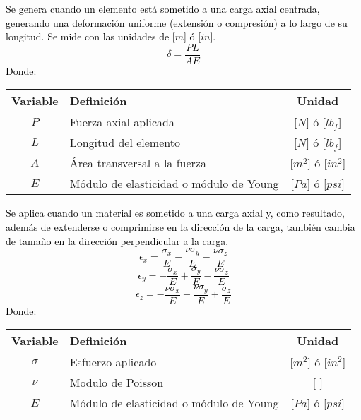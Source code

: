 \documentclass[letterpaper,11pt]{extarticle}
\newcommand{\mybox}[2]
{
    \begin{tcolorbox}[colback=color!5!white,colframe=color!75!black,boxsep=1pt,arc=0pt,outer arc=0pt,title={\textcolor{white}{#1}}]
        \textcolor{black}{#2}
    \end{tcolorbox}
}
\begin{document}
\begin{multicols}{2}
        \mybox{Deformación axial:}
        {
            Se genera cuando un elemento está sometido a una carga axial centrada, generando una deformación uniforme (extensión o compresión) a lo largo de su longitud. Se mide con las unidades de [$m$] ó [$in$].
            \begin{equation}
                \delta = \frac{PL}{AE}
            \end{equation}
            Donde:
            \begin{center}
                \begin{tabular}{ c | p{35mm} | c }
                    \hline Variable & Definición & Unidad \\ \hline 
                    $P$ & Fuerza axial aplicada & [$N$] ó [$lb_f$]\\
                    $L$ & Longitud del elemento & [$N$] ó [$lb_f$]\\
                    $A$ & Área transversal a la fuerza & [$m^2$] ó [$in^2$]\\
                    $E$ & Módulo de elasticidad o módulo de Young & [$Pa$] ó [$psi$]\\ \hline
                \end{tabular}
            \end{center}
        }

        \mybox{Modulo de Poisson:}
        {
            Se aplica cuando un material es sometido a una carga axial y, como resultado, además de extenderse o comprimirse en la dirección de la carga, también cambia de tamaño en la dirección perpendicular a la carga.
            \begin{equation}
                \epsilon_x = \frac{\sigma_x}{E} - \frac{\nu\sigma_y}{E} - \frac{\nu\sigma_z}{E}
            \end{equation}
            \begin{equation}
                \epsilon_y = -\frac{\sigma_x}{E} + \frac{\sigma_y}{E} - \frac{\nu\sigma_z}{E}
            \end{equation}
            \begin{equation}
                \epsilon_z = -\frac{\nu\sigma_x}{E} - \frac{\nu\sigma_y}{E} + \frac{\sigma_z}{E}
            \end{equation}
            Donde:
            \begin{center}
                \begin{tabular}{ c | p{35mm} | c }
                    \hline Variable & Definición & Unidad \\ \hline 
                    $\sigma$ & Esfuerzo aplicado & [$m^2$] ó [$in^2$]\\
                    $\nu$ & Modulo de Poisson & [ ]\\
                    $E$ & Módulo de elasticidad o módulo de Young & [$Pa$] ó [$psi$]\\ \hline
                \end{tabular}
            \end{center}
        }
    \end{multicols}
    
\end{document}
